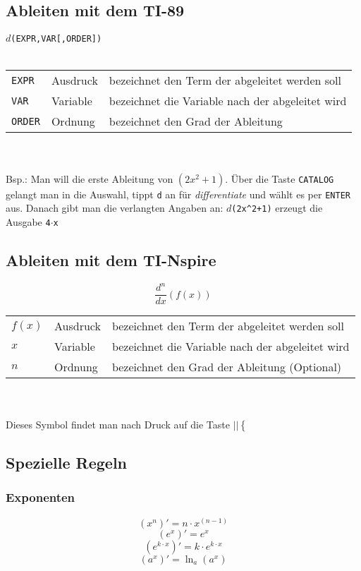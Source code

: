 \subsection{Ableiten mit dem TI-89}
$d$\verb?(EXPR,VAR[,ORDER])?\\\\
\begin{tabular}{@{}lll}
\verb?EXPR?	& Ausdruck	& bezeichnet den Term der abgeleitet werden soll \\
\verb?VAR?	& Variable	& bezeichnet die Variable nach der abgeleitet wird \\
\verb?ORDER?	& Ordnung	& bezeichnet den Grad der Ableitung \\
\end{tabular}\\\\
Bsp.: Man will die erste Ableitung von $(2x^2 + 1)$. Über die Taste \verb?CATALOG? gelangt man in die Auswahl, tippt \verb?d? an für \textit{differentiate} und wählt es per \verb?ENTER? aus. Danach gibt man die verlangten Angaben an: $d$\verb?(2x^2+1)? erzeugt die Ausgabe \verb?4?$\cdot$\verb?x?
\fi
\ifnspire
\subsection{Ableiten mit dem TI-Nspire}
\[ \frac{d^{\boxed{n}}}{d\boxed{x}}\left(\boxed{f(x)}\right) \]
\begin{tabular}{@{}lll}
$f(x)$	& Ausdruck	& bezeichnet den Term der abgeleitet werden soll \\
$x$	& Variable	& bezeichnet die Variable nach der abgeleitet wird \\
$n$	& Ordnung	& bezeichnet den Grad der Ableitung (Optional) \\
\end{tabular}\\\\
Dieses Symbol findet man nach Druck auf die Taste $\boxed{\boxed{|\boxed{}|\left\{\frac{\boxed{}}{\boxed{}}\right.}}$
\fi
\newpage

\subsection{Spezielle Regeln}

\subsubsection{Exponenten}
\[ \boxed{ (x^n)' = n\cdot x^{(n-1)} } \]
\[ \boxed{ (e^x)' = e^x } \]
\[ \boxed{ (e^{k\cdot x})' = k \cdot e^{k\cdot x} } \]
\[ \boxed{ (a^x)' = \ln_a (a^x) } \]


